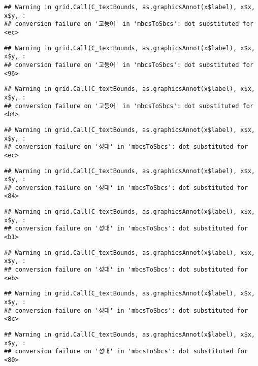 \documentclass[
]{article}
\begin{document}
\begin{verbatim}
## Warning in grid.Call(C_textBounds, as.graphicsAnnot(x$label), x$x, x$y, :
## conversion failure on '고등어' in 'mbcsToSbcs': dot substituted for <ec>
\end{verbatim}

\begin{verbatim}
## Warning in grid.Call(C_textBounds, as.graphicsAnnot(x$label), x$x, x$y, :
## conversion failure on '고등어' in 'mbcsToSbcs': dot substituted for <96>
\end{verbatim}

\begin{verbatim}
## Warning in grid.Call(C_textBounds, as.graphicsAnnot(x$label), x$x, x$y, :
## conversion failure on '고등어' in 'mbcsToSbcs': dot substituted for <b4>
\end{verbatim}

\begin{verbatim}
## Warning in grid.Call(C_textBounds, as.graphicsAnnot(x$label), x$x, x$y, :
## conversion failure on '성대' in 'mbcsToSbcs': dot substituted for <ec>
\end{verbatim}

\begin{verbatim}
## Warning in grid.Call(C_textBounds, as.graphicsAnnot(x$label), x$x, x$y, :
## conversion failure on '성대' in 'mbcsToSbcs': dot substituted for <84>
\end{verbatim}

\begin{verbatim}
## Warning in grid.Call(C_textBounds, as.graphicsAnnot(x$label), x$x, x$y, :
## conversion failure on '성대' in 'mbcsToSbcs': dot substituted for <b1>
\end{verbatim}

\begin{verbatim}
## Warning in grid.Call(C_textBounds, as.graphicsAnnot(x$label), x$x, x$y, :
## conversion failure on '성대' in 'mbcsToSbcs': dot substituted for <eb>
\end{verbatim}

\begin{verbatim}
## Warning in grid.Call(C_textBounds, as.graphicsAnnot(x$label), x$x, x$y, :
## conversion failure on '성대' in 'mbcsToSbcs': dot substituted for <8c>
\end{verbatim}

\begin{verbatim}
## Warning in grid.Call(C_textBounds, as.graphicsAnnot(x$label), x$x, x$y, :
## conversion failure on '성대' in 'mbcsToSbcs': dot substituted for <80>
\end{verbatim}
\end{document}
